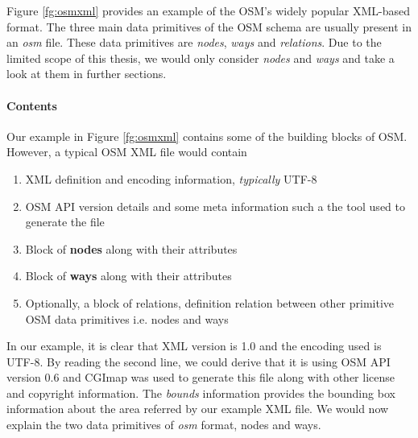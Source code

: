 Figure \ref{fg:osmxml} provides an example of the OSM's widely popular XML-based format. The three main data primitives of the OSM schema are usually present in an \textit{osm} file. These data primitives are \textit{nodes}, \textit{ways} and \textit{relations}. Due to the limited scope of this thesis, we would only consider \textit{nodes} and \textit{ways} and take a look at them in further sections.

\paragraph{Contents}
Our example in Figure \ref{fg:osmxml} contains some of the building blocks of OSM. However, a typical OSM XML file would contain
\begin{enumerate}
\item{XML definition and encoding information, \textit{typically} UTF-8}
\item{OSM API version details and some meta information such a the tool used to generate the file}
\item{Block of \textbf{nodes} along with their attributes}
\item{Block of \textbf{ways} along with their attributes}
\item{Optionally, a block of relations, definition relation between other primitive OSM data primitives i.e. nodes and ways}
\end{enumerate}

In our example, it is clear that XML version is 1.0 and the encoding used is UTF-8. By reading the second line, we could derive that it is using OSM API version 0.6 and CGImap was used to generate this file along with other license and copyright information. The \textit{bounds} information provides the bounding box information about the area referred by our example XML file. We would now explain the two data primitives of \textit{osm} format, nodes and ways.


